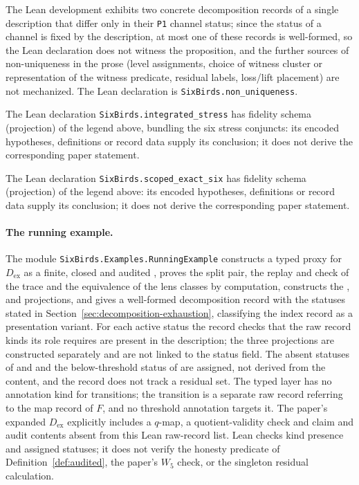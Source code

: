 \begin{description}[style=unboxed,leftmargin=0pt,itemsep=3pt]
  \item[Proposition~\ref{prop:non-uniqueness}.] The Lean development exhibits two concrete decomposition records of a single description that differ only in their \texttt{P1} channel status; since the status of a channel is fixed by the description, at most one of these records is well-formed, so the Lean declaration does not witness the proposition, and the further sources of non-uniqueness in the prose (level assignments, choice of witness cluster or representation of the witness predicate, residual labels, loss/lift placement) are not mechanized. The Lean declaration is \texttt{SixBirds.non\_uniqueness}.
  \item[Proposition~\ref{thm:integrated-stress}.] The Lean declaration \texttt{SixBirds.integrated\_stress} has fidelity schema (projection) of the legend above, bundling the six stress conjuncts: its encoded hypotheses, definitions or record data supply its conclusion; it does not derive the corresponding paper statement.
  \item[Theorem~\ref{thm:scoped-exact-six}.] The Lean declaration \texttt{SixBirds.scoped\_exact\_six} has fidelity schema (projection) of the legend above: its encoded hypotheses, definitions or record data supply its conclusion; it does not derive the corresponding paper statement.
\end{description}

\paragraph{The running example.} The module \texttt{SixBirds.Examples.RunningExample}
constructs a typed proxy for \(D_{\mathrm{ex}}\) as a finite, closed and audited
\FATCD{}, proves the split pair, the replay and check of the trace and the
equivalence of the lens classes by computation, constructs the \Pone{}, \Pfive{}
and \Psix{} projections, and gives a well-formed decomposition record with the
statuses stated in Section~\ref{sec:decomposition-exhaustion}, classifying the
index record as a presentation variant. For each active status the record
checks that the raw record kinds its role requires are present in the
description; the three projections are constructed separately and are not
linked to the status field. The absent statuses of \Ptwo{} and \Pthree{} and the
below-threshold status of \Pfour{} are assigned, not derived from the content,
and the record does not track a residual set. The typed layer has no
annotation kind for transitions; the transition is a separate raw record
referring to the map record of \(F\), and no threshold annotation targets it. The paper's expanded \(D_{\mathrm{ex}}\) explicitly includes a \(q\)-map, a
quotient-validity check and claim and audit contents absent from this Lean
raw-record list. Lean checks kind presence and assigned statuses; it does not
verify the honesty predicate of Definition~\ref{def:audited}, the paper's \(W_5\) check, or the
singleton residual calculation.
